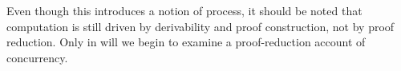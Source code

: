 


Even though this  introduces a notion of process, it should be noted that computation is still driven by derivability and proof construction, not by proof reduction.
Only in  will we begin to examine a proof-reduction account of concurrency.









